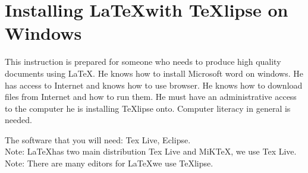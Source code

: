 \documentclass{memoir}
\begin{document}
 
\section*{Installing \LaTeX with TeXlipse on Windows}
This instruction is prepared for someone who needs to produce high quality documents using \LaTeX.
He knows how to install Microsoft word on windows. 
He has access to Internet and knows how to use browser. 
He knows how to download files from Internet and how to run them.
He must have an administrative access to the computer he is installing TeXlipse onto.
Computer literacy in general is needed. 

The software that you will need: Tex Live, Eclipse. \\
Note: \LaTeX has two main distribution Tex Live and MiKTeX, we use Tex Live.  \\ 
Note: There are many editors for \LaTeX we use TeXlipse.  
\end{document}
